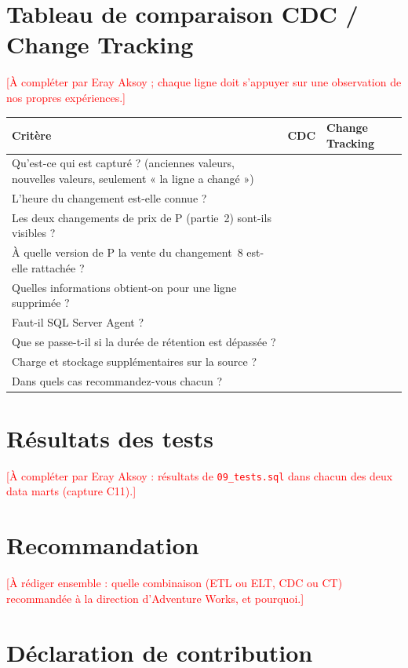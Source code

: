 \documentclass[10pt,a4paper]{article}
\newcommand{\todo}[1]{\textcolor{red}{[#1]}}
\begin{document}
\section{Tableau de comparaison CDC / Change Tracking}
\todo{À compléter par Eray Aksoy ; chaque ligne doit s'appuyer sur une observation de nos propres expériences.}

\begingroup\small
\begin{tabularx}{\textwidth}{@{}>{\raggedright\arraybackslash}p{6.2cm}XX@{}}
\toprule
Critère & CDC & Change Tracking \\
\midrule
Qu'est-ce qui est capturé ? (anciennes valeurs, nouvelles valeurs, seulement « la ligne a changé ») & & \\
L'heure du changement est-elle connue ? & & \\
Les deux changements de prix de P (partie~2) sont-ils visibles ? & & \\
À quelle version de P la vente du changement~8 est-elle rattachée ? & & \\
Quelles informations obtient-on pour une ligne supprimée ? & & \\
Faut-il SQL Server Agent ? & & \\
Que se passe-t-il si la durée de rétention est dépassée ? & & \\
Charge et stockage supplémentaires sur la source ? & & \\
Dans quels cas recommandez-vous chacun ? & & \\
\bottomrule
\end{tabularx}
\endgroup

\section{Résultats des tests}
\todo{À compléter par Eray Aksoy : résultats de \texttt{09\_tests.sql} dans chacun des deux data marts (capture C11).}

\section{Recommandation}
\todo{À rédiger ensemble : quelle combinaison (ETL ou ELT, CDC ou CT) recommandée à la direction d'Adventure Works, et pourquoi.}

\section{Déclaration de contribution}
\end{document}
